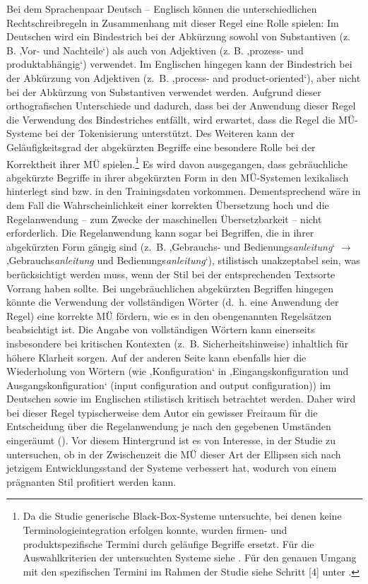Bei dem Sprachenpaar Deutsch – Englisch können die unterschiedlichen Rechtschreibregeln in Zusammenhang mit dieser Regel eine Rolle spielen: Im Deutschen wird ein Bindestrich bei der Abkürzung sowohl von Substantiven (z. B. ‚Vor- und Nachteile‘) als auch von Adjektiven (z. B. ‚prozess- und produktabhängig‘) verwendet. Im Englischen hingegen kann der Bindestrich bei der Abkürzung von Adjektiven (z.~B. ‚process- and product-oriented‘), aber nicht bei der Abkürzung von Substantiven verwendet werden. Aufgrund dieser orthografischen Unterschiede und dadurch, dass bei der Anwendung dieser Regel die Verwendung des Bindestriches entfällt, wird erwartet, dass die Regel die MÜ-Systeme bei der Tokenisierung unterstützt. Des Weiteren kann der Geläufigkeitsgrad der abgekürzten Begriffe eine besondere Rolle bei der Korrektheit ihrer MÜ spielen.\footnote{{{{Da} }}\textrm{die Studie generische Black-Box-Systeme untersuchte, bei denen keine Terminologieintegration erfolgen konnte, wurden firmen- und produktspezifische Termini durch geläufige Begriffe ersetzt. Für die Auswahlkriterien der untersuchten Systeme siehe . Für den genauen Umgang mit den spezifischen Termini im Rahmen der Studie siehe Schritt [4] unter .}} Es wird davon ausgegangen, dass gebräuchliche abgekürzte Begriffe in ihrer abgekürzten Form in den MÜ-Systemen lexikalisch hinterlegt sind bzw. in den Trainingsdaten vorkommen. Dementsprechend wäre in dem Fall die Wahrscheinlichkeit einer korrekten Übersetzung hoch und die Regelanwendung -- zum Zwecke der maschinellen Übersetzbarkeit -- nicht erforderlich. Die Regelanwendung kann sogar bei Begriffen, die in ihrer abgekürzten Form gängig sind (z.~B. ‚Gebrauchs- und Bedienungs\textit{anleitung}‘ $\to$ ‚Gebrauchs\textit{anleitung} und Bedienungs\textit{anleitung}‘), stilistisch unakzeptabel sein, was berücksichtigt werden muss, wenn der Stil bei der entsprechenden Textsorte Vorrang haben sollte. Bei ungebräuchlichen abgekürzten Begriffen hingegen könnte die Verwendung der vollständigen Wörter (d.~h. eine Anwendung der Regel) eine korrekte MÜ fördern, wie es in den obengenannten Regelsätzen beabsichtigt ist. Die Angabe von vollständigen Wörtern kann einerseits insbesondere bei kritischen Kontexten (z.~B. Sicherheitshinweise) inhaltlich für höhere Klarheit sorgen. Auf der anderen Seite kann ebenfalls hier die Wiederholung von Wörtern (wie ‚Konfiguration‘ in ‚Eingangskonfiguration und Ausgangskonfiguration‘ (input configuration and output configuration)) im Deutschen sowie im Englischen stilistisch kritisch betrachtet werden. Daher wird bei dieser Regel typischerweise dem Autor ein gewisser Freiraum für die Entscheidung über die Regelanwendung je nach den gegebenen Umständen eingeräumt (\citealt{BernthGdaniec2001}). Vor diesem Hintergrund ist es von Interesse, in der Studie zu untersuchen, ob in der Zwischenzeit die MÜ dieser Art der Ellipsen sich nach jetzigem Entwicklungsstand der Systeme verbessert hat, wodurch von einem prägnanten Stil profitiert werden kann.

